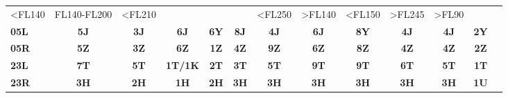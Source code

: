 \documentclass[10pt,landscape,a4paper]{article}
\begin{document}
\begin{textblock}{40}
\begin{table}[]
\begin{tabular}{lcccccccccccc}
\multicolumn{1}{r|}{\scriptsize \textless{}FL140} & 
\multicolumn{1}{r|}{\scriptsize FL140-FL200} & 
\multicolumn{1}{r|}{\scriptsize \textless{}FL210} & 
\multicolumn{1}{r||}{} & 
\multicolumn{1}{r|}{} & 
\multicolumn{1}{r|}{} & 
\multicolumn{1}{r|}{\scriptsize \textless{}FL250} & 
\multicolumn{1}{r|}{\scriptsize \textgreater{}FL140} & 
\multicolumn{1}{r|}{\scriptsize \textless{}FL150} & 
\multicolumn{1}{r|}{\scriptsize \textgreater{}FL245} & 
\multicolumn{1}{l|}{\scriptsize \textgreater{}FL90} & 
\multicolumn{1}{c|}{} \\ \cline{1-12}
\multicolumn{1}{|l|}{\textbf{05L}} & 
\multicolumn{1}{c|}{\textbf{5J}} & 
\multicolumn{1}{c|}{\textbf{3J}} & 
\multicolumn{1}{c|}{\textbf{6J}} & 
\multicolumn{1}{c||}{\textbf{6Y}} & 
\multicolumn{1}{c|}{\textbf{8J}} & 
\multicolumn{1}{c|}{\textbf{4J}} & 
\multicolumn{1}{c|}{\textbf{6J}} & 
\multicolumn{1}{c|}{\textbf{8Y}} & 
\multicolumn{1}{c|}{\textbf{4J}} & 
\multicolumn{1}{c|}{\textbf{4J}} & 
\multicolumn{1}{c|}{\textbf{2Y}} & 
\multicolumn{1}{c|}{} \\ \cline{1-12}
\multicolumn{1}{|l|}{\textbf{05R}} & 
\multicolumn{1}{c|}{\textbf{5Z}} & 
\multicolumn{1}{c|}{\textbf{3Z}} & 
\multicolumn{1}{c|}{\textbf{6Z}} & 
\multicolumn{1}{c||}{\textbf{1Z}} & 
\multicolumn{1}{c|}{\textbf{4Z}} & 
\multicolumn{1}{c|}{\textbf{9Z}} & 
\multicolumn{1}{c|}{\textbf{6Z}} & 
\multicolumn{1}{c|}{\textbf{8Z}} & 
\multicolumn{1}{c|}{\textbf{4Z}} & 
\multicolumn{1}{c|}{\textbf{4Z}} & 
\multicolumn{1}{c|}{\textbf{2Z}} & 
\multicolumn{1}{c|}{} \\ \cline{1-12}
\multicolumn{1}{|l|}{\textbf{23L}} & 
\multicolumn{1}{c|}{\textbf{7T}} & 
\multicolumn{1}{c|}{\textbf{5T}} & 
\multicolumn{1}{c|}{\textbf{1T/1K}} & 
\multicolumn{1}{c||}{\textbf{2T}} & 
\multicolumn{1}{c|}{\textbf{3T}} & 
\multicolumn{1}{c|}{\textbf{5T}} & 
\multicolumn{1}{c|}{\textbf{9T}} & 
\multicolumn{1}{c|}{\textbf{9T}} & 
\multicolumn{1}{c|}{\textbf{6T}} & 
\multicolumn{1}{c|}{\textbf{5T}} & 
\multicolumn{1}{c|}{\textbf{1T}} & 
\multicolumn{1}{c|}{} \\ \cline{1-12}
\multicolumn{1}{|l|}{\textbf{23R}} & 
\multicolumn{1}{c|}{\textbf{3H}} & 
\multicolumn{1}{c|}{\textbf{2H}} & 
\multicolumn{1}{c|}{\textbf{1H}} & 
\multicolumn{1}{c||}{\textbf{2H}} & 
\multicolumn{1}{c|}{\textbf{3H}} & 
\multicolumn{1}{c|}{\textbf{3H}} & 
\multicolumn{1}{c|}{\textbf{3H}} & 
\multicolumn{1}{c|}{\textbf{3H}} & 
\multicolumn{1}{c|}{\textbf{3H}} & 
\multicolumn{1}{c|}{\textbf{3H}} & 
\multicolumn{1}{c|}{\textbf{1U}} & 
\multicolumn{1}{c|}{} \\ \cline{1-12}

\end{tabular}
\end{table}
\end{textblock}
\end{document}
